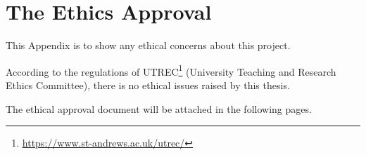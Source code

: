 \chapter{The Ethics Approval}\label{app:c}
This Appendix is to show any ethical concerns about this project.

According to the regulations of UTREC\footnote{\url{https://www.st-andrews.ac.uk/utrec/}} (University Teaching and Research Ethics Committee), there is no ethical issues raised by this thesis.

The ethical approval document will be attached in the following pages.

\newpage
